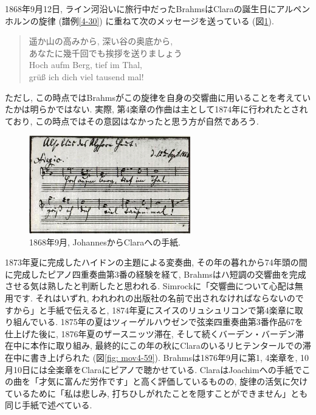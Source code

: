 1868年9月12日, ライン河沿いに旅行中だったBrahms\cite{compos}はClaraの誕生日にアルペンホルンの旋律
(譜例\ref{4-30}) に重ねて次のメッセージを送っている (図\ref{fig: alphorn}).
\begin{quote}
\begin{multicols}{2}
	遥か山の高みから, 深い谷の奥底から, \\
	あなたに幾千回でも挨拶を送りましょう \\
	Hoch aufm Berg, tief im Thal, \\
	grüß ich dich viel tausend mal!
\end{multicols}
\end{quote}
ただし, この時点ではBrahmsがこの旋律を自身の交響曲に用いることを考えていたかは明らかではない.
実際, 第4楽章の作曲は主として1874年に行われたとされており, この時点ではその意図はなかったと思う方が自然であろう\cite{frisch}.

\begin{figure}[htbp]
	\begin{center}
    \includegraphics[clip,width=7.0cm]{./figure/alphorn.jpg}
	\caption{1868年9月, JohannesからClaraへの手紙.}
    \label{fig: alphorn}
	\end{center}
\end{figure}

1873年夏に完成したハイドンの主題による変奏曲, その年の暮れから74年頭の間に完成したピアノ四重奏曲第3番の経験を経て, Brahmsはハ短調の交響曲を完成させる気は熟したと判断したと思われる.
Simrockに「交響曲について心配は無用です. それはいずれ, われわれの出版社の名前で出されなければならないのですから」と手紙で伝える\cite{ogt}と,
1874年夏にスイスのリュシュリコンで第4楽章に取り組んでいる.
1875年の夏はツィーゲルハウゼンで弦楽四重奏曲第3番作品67を仕上げた\cite{compos}後に, 1876年夏のザースニッツ滞在,
そして続くバーデン・バーデン滞在中に本作に取り組み, 最終的にこの年の秋にClaraのいるリヒテンタールでの滞在中に書き上げられた (図\ref{fig: mov4-59}).
Brahmsは1876年9月に第1, 4楽章を, 10月10日には全楽章をClaraにピアノで聴かせている.
ClaraはJoachimへの手紙でこの曲を「才気に富んだ労作です」と高く評価しているものの, 旋律の活気に欠けているために「私は悲しみ,
打ちひしがれたことを隠すことができません」とも同じ手紙で述べている\cite{compos}.


